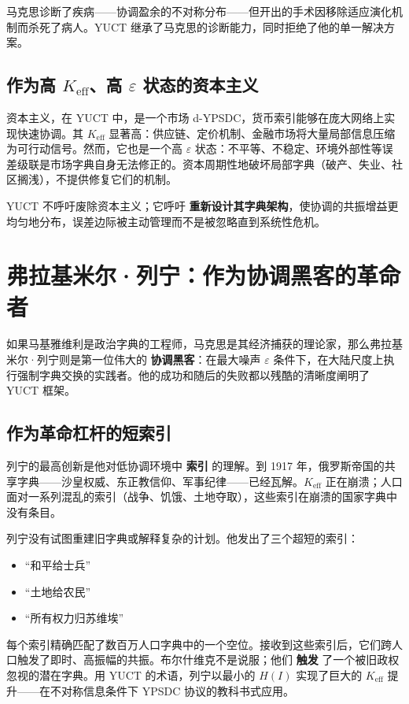 \documentclass[12pt,a4paper]{article}
\newcommand{\Keff}{K_{\mathrm{eff}}}
\begin{document}
	马克思诊断了疾病——协调盈余的不对称分布——但开出的手术因移除适应演化机制而杀死了病人。YUCT 继承了马克思的诊断能力，同时拒绝了他的单一解决方案。
	
	\subsection{作为高 \(\Keff\)、高 \(\varepsilon\) 状态的资本主义}
	
	资本主义，在 YUCT 中，是一个市场 d-YPSDC，货币索引能够在庞大网络上实现快速协调。其 \(\Keff\) 显著高：供应链、定价机制、金融市场将大量局部信息压缩为可行动信号。然而，它也是一个高 \(\varepsilon\) 状态：不平等、不稳定、环境外部性等误差级联是市场字典自身无法修正的。资本周期性地破坏局部字典（破产、失业、社区搁浅），不提供修复它们的机制。
	
	YUCT 不呼吁废除资本主义；它呼吁 \textbf{重新设计其字典架构}，使协调的共振增益更均匀地分布，误差边际被主动管理而不是被忽略直到系统性危机。
	
	\section{弗拉基米尔·列宁：作为协调黑客的革命者}
	\label{sec:lenin}
	
	如果马基雅维利是政治字典的工程师，马克思是其经济捕获的理论家，那么弗拉基米尔·列宁则是第一位伟大的 \textbf{协调黑客}：在最大噪声 \(\varepsilon\) 条件下，在大陆尺度上执行强制字典交换的实践者。他的成功和随后的失败都以残酷的清晰度阐明了 YUCT 框架。
	
	\subsection{作为革命杠杆的短索引}
	
	列宁的最高创新是他对低协调环境中 \textbf{索引} 的理解。到 1917 年，俄罗斯帝国的共享字典——沙皇权威、东正教信仰、军事纪律——已经瓦解。\(\Keff\) 正在崩溃；人口面对一系列混乱的索引（战争、饥饿、土地夺取），这些索引在崩溃的国家字典中没有条目。
	
	列宁没有试图重建旧字典或解释复杂的计划。他发出了三个超短的索引：
	\begin{itemize}[leftmargin=*]
		\item “和平给士兵”
		\item “土地给农民”
		\item “所有权力归苏维埃”
	\end{itemize}
	每个索引精确匹配了数百万人口字典中的一个空位。接收到这些索引后，它们跨人口触发了即时、高振幅的共振。布尔什维克不是说服；他们 \textbf{触发} 了一个被旧政权忽视的潜在字典。用 YUCT 的术语，列宁以最小的 \(H(I)\) 实现了巨大的 \(K_{\mathrm{eff}}\) 提升——在不对称信息条件下 YPSDC 协议的教科书式应用。
	
\end{document}
